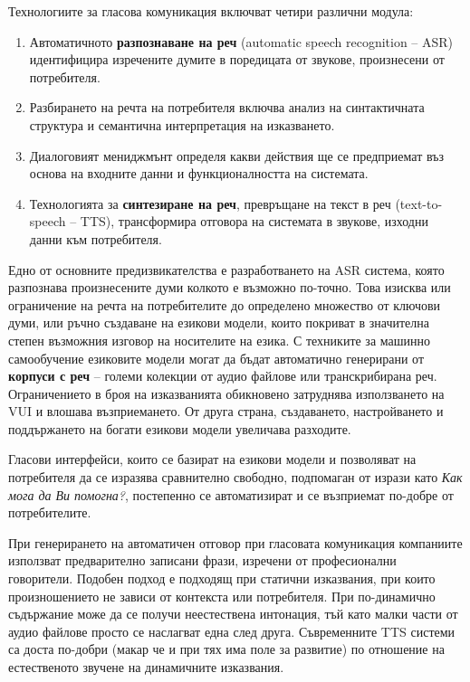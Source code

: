 \documentclass[]{../../metanetpaper}
\begin{document}
\begin{multicols}{2}
Технологиите за гласова комуникация включват четири различни модула:

\begin{enumerate}
\item Автоматичното \textbf{разпознаване на реч}  (automatic speech recognition -- ASR)  идентифицира изречените думите в поредицата от звукове, произнесени от потребителя.
\item Разбирането на речта на потребителя включва анализ на синтактичната структура и семантична интерпретация  на изказването.
\item Диалоговият мениджмънт определя какви действия ще се предприемат въз основа на входните данни и функционалността на системата.
\item Технологията за \textbf{синтезиране на реч}, превръщане на текст в
 реч (text-to-speech -- TTS), трансформира отговора на системата в
 звукове, изходни данни към потребителя.
\end{enumerate}

Едно от основните предизвикателства е разработването на ASR система, която разпознава произнесените думи колкото е възможно по-точно. Това изисква или
 ограничение на речта на потребителите до определено множество от ключови думи, или ръчно създаване на езикови модели, които покриват
в значителна степен възможния изговор на носителите на езика.
С техниките за машинно самообучение езиковите модели могат да бъдат автоматично генерирани от \textbf{корпуси с реч} -- големи колекции от аудио файлове или транскрибирана реч.
Ограничението в броя на изказванията обикновено затруднява  използването на VUI  и влошава възприемането. От друга страна, създаването, настройването и поддържането на богати  езикови модели увеличава разходите.
 
Гласови интерфейси, които се базират на езикови модели и позволяват на потребителя да се изразява сравнително свободно, подпомаган от изрази като \textit{Как мога да Ви помогна?}, постепенно се автоматизират и се възприемат по-добре от потребителите.


При генерирането на автоматичен отговор при гласовата комуникация компаниите използват предварително записани фрази, изречени от професионални говорители. Подобен подход е подходящ при статични изказвания, при които произношението не зависи от контекста или потребителя. При по-динамично съдържание може да се получи неестествена интонация, тъй като  малки части от аудио файлове просто се наслагват една след друга. Съвременните TTS системи са доста по-добри (макар че и при тях  има поле за развитие) по отношение на естественото звучене 
 на динамичните изказвания.


\end{multicols}
\end{document}
